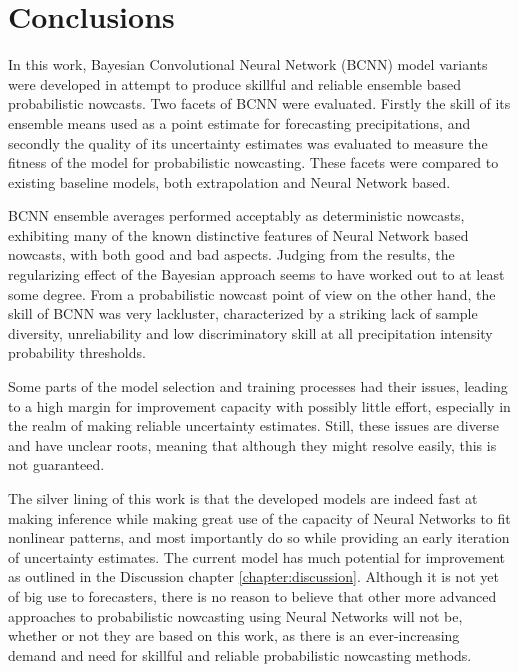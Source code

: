 \chapter{Conclusions}
\label{chapter:conclusions}


In this work, Bayesian Convolutional Neural Network (BCNN) model variants were developed in attempt to produce skillful and reliable ensemble based probabilistic nowcasts. Two facets of BCNN were evaluated. Firstly the skill of its ensemble means used as a point estimate for forecasting precipitations, and secondly the quality of its uncertainty estimates was evaluated to measure the fitness of the model for probabilistic nowcasting. These facets were compared to existing baseline models, both extrapolation and Neural Network based. 

BCNN ensemble averages performed acceptably as deterministic nowcasts, exhibiting many of the known distinctive features of Neural Network based nowcasts, with both good and bad aspects. Judging from the results, the regularizing effect of the Bayesian approach seems to have worked out to at least some degree. From a probabilistic nowcast point of view on the other hand, the skill of BCNN was very lackluster, characterized by a striking lack of sample diversity, unreliability and low discriminatory skill at all precipitation intensity probability thresholds.

Some parts of the model selection and training processes had their issues, leading to a high margin for improvement capacity with possibly little effort, especially in the realm of making reliable uncertainty estimates. Still, these issues are diverse and have unclear roots, meaning that although they might resolve easily, this is not guaranteed. 

The silver lining of this work is that the developed models are indeed fast at making inference while making great use of the capacity of Neural Networks to fit nonlinear patterns, and most importantly do so while providing an early iteration of uncertainty estimates. The current model has much potential for improvement as outlined in the Discussion chapter \ref{chapter:discussion}. Although it is not yet of big use to forecasters, there is no reason to believe that other more advanced approaches to probabilistic nowcasting using Neural Networks will not be, whether or not they are based on this work, as there is an ever-increasing demand and need for skillful and reliable probabilistic nowcasting methods.